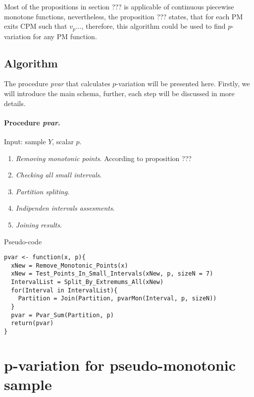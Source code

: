 \documentclass[12pt, a4paper]{article}
\numberwithin{equation}{section}
\begin{document}
Most of the propositions in section ??? is applicable of continuous piecewise monotone functions, nevertheless,
the proposition ??? states, that for each PM exits CPM such that 
$v_p...$, therefore, this algorithm could be used to find $p$-variation
for any PM function.

\subsection{Algorithm}

The procedure \emph{pvar} that calculates
$p$-variation will be presented here. Firstly,
we will introduce the main schema, further, each step will
be discussed in more details.

\paragraph{Procedure \emph{pvar}.}
Input: sample $Y$, scalar $p$.

\begin{enumerate}
  \item \emph{Removing monotonic points}. According to proposition ???
  
  
  \item \emph{Checking all small intervals}. 

  \item \emph{Partition spliting}. 
  
  \item \emph{Indipenden intervals assesments}.
  
  \item \emph{Joining results}.  
  
\end{enumerate}

Pseudo-code
\begin{lstlisting}
pvar <- function(x, p){
  xNew = Remove_Monotonic_Points(x) 
  xNew = Test_Points_In_Small_Intervals(xNew, p, sizeN = 7) 
  IntervalList = Split_By_Extremums_All(xNew)
  for(Interval in IntervalList){
    Partition = Join(Partition, pvarMon(Interval, p, sizeN))
  }
  pvar = Pvar_Sum(Partition, p)  
  return(pvar)
}
\end{lstlisting}
  


\section{p-variation for pseudo-monotonic sample}  
\end{document}
